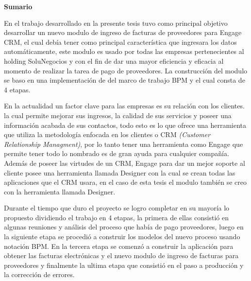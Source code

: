 {\large \textbf{Sumario}}
\newline
\par
En el trabajo desarrollado en la presente tesis tuvo como principal objetivo desarrollar un nuevo modulo de ingreso de facturas de proveedores para Engage CRM, el cual debía tener como principal característica que ingresara los datos automáticamente, este modulo es usado por todas las empresas pertenecientes al holding SoluNegocios y con el fin de dar una mayor eficiencia y eficacia al momento de realizar la tarea de pago de proveedores. La construcción del modulo se baso en una implementación de del marco de trabajo BPM y el cual consta de 4 etapas.
\newline
\par
En la actualidad un factor clave para las empresas es su relación con los clientes. la cual permite mejorar sus ingresos, la calidad de sus servicios y poseer una información acabada de sus contactos, todo esto es lo que ofrece una herramienta que utiliza la metodología enfocada en los clientes o CRM \textit{(Customer Relationship Managment)}, por lo tanto tener una herramienta como Engage que permite tener todo lo nombrado es de gran ayuda para cualquier compañía. Además de poseer las virtudes de un CRM, Engage para dar un mejor soporte al cliente posee una herramienta llamada Designer con la cual se crean todas las aplicaciones que el CRM usara, en el caso de esta tesis el modulo también se creo con la herramienta llamada Designer.
\newline
\par
Durante el tiempo que duro el proyecto se logro completar en su mayoría lo propuesto dividiendo el trabajo en 4 etapas, la primera de ellas consistió en algunas reuniones y análisis del proceso que había de pago proveedores, luego en la siguiente etapa se procedió a construir los modelos del nuevo proceso usando notación BPM. En la tercera etapa se comenzó a construir la aplicación para obtener las facturas electrónicas y el nuevo modulo de ingreso de facturas para proveedores y finalmente la ultima etapa que consistió en el paso a producción y la corrección de errores.
